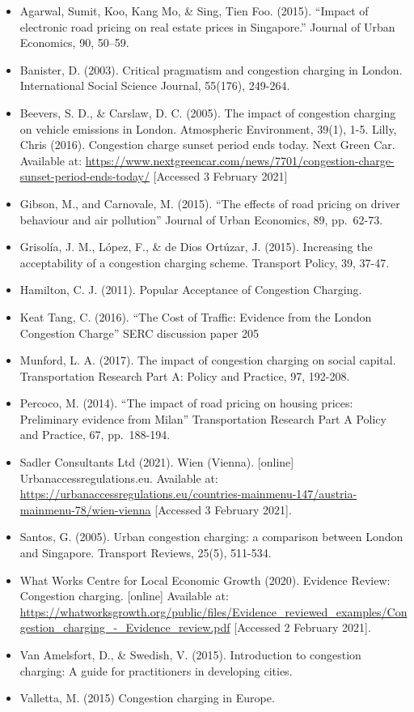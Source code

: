 \documentclass[
]{book}
\providecommand{\tightlist}{%
  \setlength{\itemsep}{0pt}\setlength{\parskip}{0pt}}
\begin{document}
\begin{itemize}
\tightlist
\item
  Agarwal, Sumit, Koo, Kang Mo, \& Sing, Tien Foo. (2015). ``Impact of electronic road pricing on real estate prices in Singapore.'' Journal of Urban Economics, 90, 50--59.
\item
  Banister, D. (2003). Critical pragmatism and congestion charging in London. International Social Science Journal, 55(176), 249-264.
\item
  Beevers, S. D., \& Carslaw, D. C. (2005). The impact of congestion charging on vehicle emissions in London. Atmospheric Environment, 39(1), 1-5.
  Lilly, Chris (2016). Congestion charge sunset period ends today. Next Green Car. Available at:
  \url{https://www.nextgreencar.com/news/7701/congestion-charge-sunset-period-ends-today/} {[}Accessed 3 February 2021{]}
\item
  Gibson, M., and Carnovale, M. (2015). ``The effects of road pricing on driver behaviour and air pollution'' Journal of Urban Economics, 89, pp.~62-73.
\item
  Grisolía, J. M., López, F., \& de Dios Ortúzar, J. (2015). Increasing the acceptability of a congestion charging scheme. Transport Policy, 39, 37-47.
\item
  Hamilton, C. J. (2011). Popular Acceptance of Congestion Charging.
\item
  Keat Tang, C. (2016). ``The Cost of Traffic: Evidence from the London Congestion Charge'' SERC discussion paper 205
\item
  Munford, L. A. (2017). The impact of congestion charging on social capital. Transportation Research Part A: Policy and Practice, 97, 192-208.
\item
  Percoco, M. (2014). ``The impact of road pricing on housing prices: Preliminary evidence from Milan'' Transportation Research Part A Policy and Practice, 67, pp.~188-194.
\item
  Sadler Consultants Ltd (2021). Wien (Vienna). {[}online{]} Urbanaccessregulations.eu. Available at: \url{https://urbanaccessregulations.eu/countries-mainmenu-147/austria-mainmenu-78/wien-vienna} {[}Accessed 3 February 2021{]}.
\item
  Santos, G. (2005). Urban congestion charging: a comparison between London and Singapore. Transport Reviews, 25(5), 511-534.
\item
  What Works Centre for Local Economic Growth (2020). Evidence Review: Congestion charging. {[}online{]} Available at: \url{https://whatworksgrowth.org/public/files/Evidence_reviewed_examples/Congestion_charging_-_Evidence_review.pdf} {[}Accessed 2 February 2021{]}.
\item
  Van Amelsfort, D., \& Swedish, V. (2015). Introduction to congestion charging: A guide for practitioners in developing cities.
\item
  Valletta, M. (2015) Congestion charging in Europe.
\end{itemize}
\end{document}

